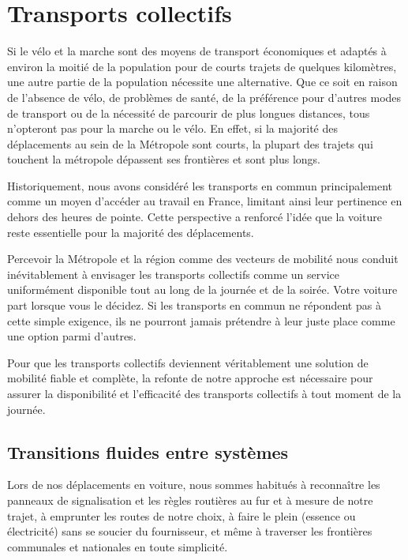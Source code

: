 \chapter{Transports collectifs}


Si le vélo et la marche sont des moyens de transport économiques et
adaptés à environ la moitié de la population pour de courts trajets de
quelques kilomètres, une autre partie de la population nécessite une
alternative. Que ce soit en raison de l'absence de vélo, de problèmes
de santé, de la préférence pour d'autres modes de transport ou de la
nécessité de parcourir de plus longues distances, tous n'opteront pas
pour la marche ou le vélo. En effet, si la majorité des déplacements
au sein de la Métropole sont courts, la plupart des trajets qui
touchent la métropole dépassent ses frontières et sont plus longs.

Historiquement, nous avons considéré les transports en commun
principalement comme un moyen d'accéder au travail en France, limitant
ainsi leur pertinence en dehors des heures de pointe. Cette
perspective a renforcé l'idée que la voiture reste essentielle pour la
majorité des déplacements.

Percevoir la Métropole et la région comme des vecteurs de mobilité
nous conduit inévitablement à envisager les transports collectifs
comme un service uniformément disponible tout au long de la journée et
de la soirée. Votre voiture part lorsque vous le décidez. Si les
transports en commun ne répondent pas à cette simple exigence, ils ne
pourront jamais prétendre à leur juste place comme une option parmi
d'autres.

Pour que les transports collectifs deviennent véritablement une
solution de mobilité fiable et complète, la refonte de notre approche
est nécessaire pour assurer la disponibilité et l'efficacité des
transports collectifs à tout moment de la journée.


\section{Transitions fluides entre systèmes}


Lors de nos déplacements en voiture, nous sommes habitués à
reconnaître les panneaux de signalisation et les règles routières au
fur et à mesure de notre trajet, à emprunter les routes de notre
choix, à faire le plein (essence ou électricité) sans se soucier du
fournisseur, et même à traverser les frontières communales et
nationales en toute simplicité.

